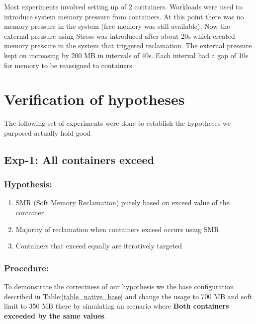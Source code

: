     Most experiments involved setting up of 2 containers. Workloads were used to introduce system memory pressure from containers. At 
this point there was no memory pressure in the system (free memory was still available). Now the external pressure using Stress was 
introduced after about 20s which created memory pressure in the system that triggered reclamation. The external pressure kept on increasing 
by 200 MB in intervals of 40s. Each interval had a gap of 10s for memory to be reassigned to containers.
  

  \section{Verification of hypotheses}
    
    The following set of experiments were done to establish the hypotheses we purposed actually hold good 
    
    \subsection{Exp-1: All containers exceed}
	
	\subsubsection{Hypothesis:} 
	  \begin{enumerate}
	    \item SMR (Soft Memory Reclamation) purely based on exceed value of the container
	    \item Majority of reclamation when containers exceed occurs using SMR
	    \item Containers that exceed equally are iteratively targeted
	  \end{enumerate} 
	
	\subsubsection{Procedure:}
	  To demonstrate the correctness of our hypothesis we the base configuration described in Table:\ref{table_native_base} and change 
the usage to 700 MB and soft limit to 350 MB there by simulating an scenario where \textbf{Both containers exceeded by the same values}.
	
